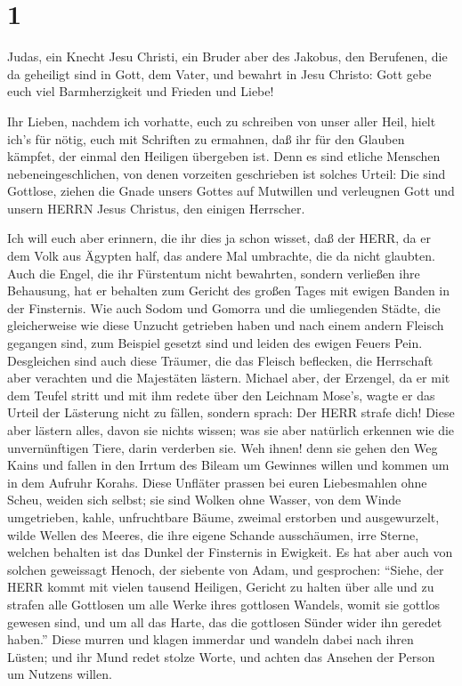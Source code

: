 \hypertarget{section}{%
\section{1}\label{section}}

 Judas, ein Knecht Jesu Christi, ein Bruder aber des
Jakobus, den Berufenen, die da geheiligt sind in Gott, dem Vater, und
bewahrt in Jesu Christo:  Gott gebe euch viel Barmherzigkeit
und Frieden und Liebe!

 Ihr Lieben, nachdem ich vorhatte, euch zu schreiben von
unser aller Heil, hielt ich's für nötig, euch mit Schriften zu ermahnen,
daß ihr für den Glauben kämpfet, der einmal den Heiligen übergeben ist.
 Denn es sind etliche Menschen nebeneingeschlichen, von
denen vorzeiten geschrieben ist solches Urteil: Die sind Gottlose,
ziehen die Gnade unsers Gottes auf Mutwillen und verleugnen Gott und
unsern HERRN Jesus Christus, den einigen Herrscher.

 Ich will euch aber erinnern, die ihr dies ja schon wisset,
daß der HERR, da er dem Volk aus Ägypten half, das andere Mal umbrachte,
die da nicht glaubten.  Auch die Engel, die ihr Fürstentum
nicht bewahrten, sondern verließen ihre Behausung, hat er behalten zum
Gericht des großen Tages mit ewigen Banden in der Finsternis.
 Wie auch Sodom und Gomorra und die umliegenden Städte, die
gleicherweise wie diese Unzucht getrieben haben und nach einem andern
Fleisch gegangen sind, zum Beispiel gesetzt sind und leiden des ewigen
Feuers Pein.  Desgleichen sind auch diese Träumer, die das
Fleisch beflecken, die Herrschaft aber verachten und die Majestäten
lästern.  Michael aber, der Erzengel, da er mit dem Teufel
stritt und mit ihm redete über den Leichnam Mose's, wagte er das Urteil
der Lästerung nicht zu fällen, sondern sprach: Der HERR strafe dich!
 Diese aber lästern alles, davon sie nichts wissen; was sie
aber natürlich erkennen wie die unvernünftigen Tiere, darin verderben
sie.  Weh ihnen! denn sie gehen den Weg Kains und fallen in
den Irrtum des Bileam um Gewinnes willen und kommen um in dem Aufruhr
Korahs.  Diese Unfläter prassen bei euren Liebesmahlen ohne
Scheu, weiden sich selbst; sie sind Wolken ohne Wasser, von dem Winde
umgetrieben, kahle, unfruchtbare Bäume, zweimal erstorben und
ausgewurzelt,  wilde Wellen des Meeres, die ihre eigene
Schande ausschäumen, irre Sterne, welchen behalten ist das Dunkel der
Finsternis in Ewigkeit.  Es hat aber auch von solchen
geweissagt Henoch, der siebente von Adam, und gesprochen: ``Siehe, der
HERR kommt mit vielen tausend Heiligen,  Gericht zu halten
über alle und zu strafen alle Gottlosen um alle Werke ihres gottlosen
Wandels, womit sie gottlos gewesen sind, und um all das Harte, das die
gottlosen Sünder wider ihn geredet haben.''  Diese murren
und klagen immerdar und wandeln dabei nach ihren Lüsten; und ihr Mund
redet stolze Worte, und achten das Ansehen der Person um Nutzens willen.

